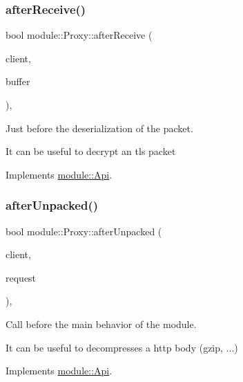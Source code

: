\subsubsection{\texorpdfstring{after\+Receive()}{afterReceive()}}
{\footnotesize\ttfamily bool module\+::\+Proxy\+::after\+Receive (\begin{DoxyParamCaption}\item[{const \hyperlink{structnet_1_1IClient}{net\+::\+I\+Client} \&}]{client,  }\item[{std\+::string \&}]{buffer }\end{DoxyParamCaption})\hspace{0.3cm}{\ttfamily [virtual]}, {\ttfamily [noexcept]}}



Just before the deserialization of the packet. 

It can be useful to decrypt an tls packet 

Implements \hyperlink{structmodule_1_1Api_ad8b56820e4f53bf65d34447184edef20}{module\+::\+Api}.

\mbox{\label{classmodule_1_1Proxy_a16524232b12bd03353c79bcda4bd8d15}} 
\subsubsection{\texorpdfstring{after\+Unpacked()}{afterUnpacked()}}
{\footnotesize\ttfamily bool module\+::\+Proxy\+::after\+Unpacked (\begin{DoxyParamCaption}\item[{const \hyperlink{structnet_1_1IClient}{net\+::\+I\+Client} \&}]{client,  }\item[{\hyperlink{structhttp_1_1IRequest}{http\+::\+I\+Request} \&}]{request }\end{DoxyParamCaption})\hspace{0.3cm}{\ttfamily [virtual]}, {\ttfamily [noexcept]}}



Call before the main behavior of the module. 

It can be useful to decompresses a http body (gzip, ...) 

Implements \hyperlink{structmodule_1_1Api_a291297e6d233e69b82c976e085f7c237}{module\+::\+Api}.

\mbox{\label{classmodule_1_1Proxy_a3b88487ecaaa856f319d78f2aa6358c1}} 
